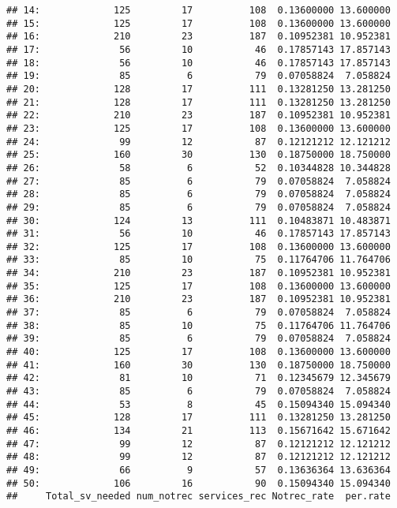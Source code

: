 \documentclass[
]{article}
\begin{document}
\begin{verbatim}
## 14:             125         17          108  0.13600000 13.600000
## 15:             125         17          108  0.13600000 13.600000
## 16:             210         23          187  0.10952381 10.952381
## 17:              56         10           46  0.17857143 17.857143
## 18:              56         10           46  0.17857143 17.857143
## 19:              85          6           79  0.07058824  7.058824
## 20:             128         17          111  0.13281250 13.281250
## 21:             128         17          111  0.13281250 13.281250
## 22:             210         23          187  0.10952381 10.952381
## 23:             125         17          108  0.13600000 13.600000
## 24:              99         12           87  0.12121212 12.121212
## 25:             160         30          130  0.18750000 18.750000
## 26:              58          6           52  0.10344828 10.344828
## 27:              85          6           79  0.07058824  7.058824
## 28:              85          6           79  0.07058824  7.058824
## 29:              85          6           79  0.07058824  7.058824
## 30:             124         13          111  0.10483871 10.483871
## 31:              56         10           46  0.17857143 17.857143
## 32:             125         17          108  0.13600000 13.600000
## 33:              85         10           75  0.11764706 11.764706
## 34:             210         23          187  0.10952381 10.952381
## 35:             125         17          108  0.13600000 13.600000
## 36:             210         23          187  0.10952381 10.952381
## 37:              85          6           79  0.07058824  7.058824
## 38:              85         10           75  0.11764706 11.764706
## 39:              85          6           79  0.07058824  7.058824
## 40:             125         17          108  0.13600000 13.600000
## 41:             160         30          130  0.18750000 18.750000
## 42:              81         10           71  0.12345679 12.345679
## 43:              85          6           79  0.07058824  7.058824
## 44:              53          8           45  0.15094340 15.094340
## 45:             128         17          111  0.13281250 13.281250
## 46:             134         21          113  0.15671642 15.671642
## 47:              99         12           87  0.12121212 12.121212
## 48:              99         12           87  0.12121212 12.121212
## 49:              66          9           57  0.13636364 13.636364
## 50:             106         16           90  0.15094340 15.094340
##     Total_sv_needed num_notrec services_rec Notrec_rate  per.rate
\end{verbatim}
\end{document}
